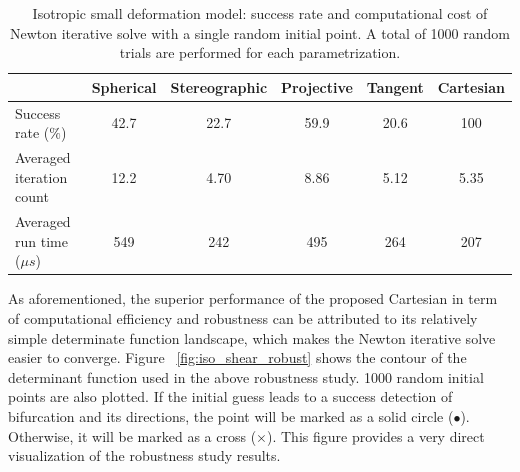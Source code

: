 \documentclass[12pt]{article}
\numberwithin{equation}{section}
\begin{document}
\begin{table}[H]
  \begin{center}
    \begin{tabular}{l | c c c c c}
      \toprule
       &  Spherical    &   Stereographic   & Projective   &   Tangent   &   Cartesian                 \\
      \midrule
      Success rate ($\%$)                      &    42.7    &    22.7    &    59.9     &    20.6     &   100          \\
      Averaged iteration count               &    12.2    &    4.70    &    8.86     &    5.12     &   5.35          \\
      Averaged run time (${\mu}s$)     &    549     &    242     &    495      &    264      &   207         \\
      \bottomrule
    \end{tabular}
    \caption{Isotropic small deformation model: success rate and computational cost of Newton iterative solve with a single random initial point. A total of 1000 random trials are performed for each parametrization.}
    \label{tab:iso_shear_random_para}
  \end{center}
\end{table}

As aforementioned, the superior performance of the proposed Cartesian
in term of computational efficiency and robustness can be attributed
to its relatively simple determinate function landscape, which makes
the Newton iterative solve easier to converge. Figure~
\ref{fig:iso_shear_robust} shows the contour of the determinant
function used in the above robustness  study. 1000 random initial
points are also plotted. If the initial guess leads to a success
detection of bifurcation and its directions, the point will be marked
as a solid circle ($\bullet$). Otherwise, it will be marked as a cross
($\times$). This figure provides a very direct visualization of the
robustness study results.
\end{document}
